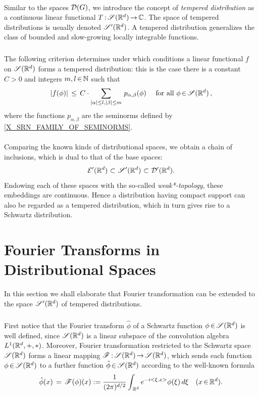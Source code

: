 \documentclass[11pt,twoside]{article}
\begin{document}
\paragraph{} %
Similar to the spaces ${\mathcal{D}}(G)$,
we introduce the concept of \textit{tempered distribution}
as a continuous linear functional $T {\,:\,}\mathscr{S}({\mathbb{R}}^d) {\,\to\,} {\mathbb{C}}$.
The space of tempered distributions is usually denoted $\mathscr{S}'({\mathbb{R}}^d)$.
A tempered distribution generalizes the class of bounded and slow-growing
locally integrable functions.

\subparagraph{}
The following criterion determines
under which conditions a linear functional $f$ on $\mathscr{S}({\mathbb{R}}^d)$
forms a tempered distribution:
this is the case 
\iff
there is a constant $C > 0$ and integers $m,l {\,\in\,} {\mathbb{N}}$ such that
\[
\abs{ f(\phi) } \, \leq \,
C \cdot \sum_{\abs{\alpha} \leq l, \abs{\beta} \leq m} \, p_{\alpha,\beta}(\phi)
\qfa \phi \xeof \SRd\,,
\]
where the functions $p_{\alpha,\beta}$ are the seminorms
defined by \eqref{X_SRN_FAMILY_OF_SEMINORMS}.

\paragraph{} %
Comparing the known kinds of distributional spaces,
we obtain a chain of inclusions,
which is dual to that of the base spaces:
\[
{\mathcal{E}}'({\mathbb{R}}^d) \, {\,\subset\,} \, \mathscr{S}'({\mathbb{R}}^d) \, {\,\subset\,} \, {\mathcal{D}}'({\mathbb{R}}^d).
\]
Endowing each of these spaces with the so-called \textit{weak*-topology},
these embeddings are continuous.
Hence a distribution having compact support can also be regarded
as a tempered distribution,
which in turn gives rise to a Schwartz distribution.

\section{Fourier Transforms in Distributional Spaces}                          %
In this section we shall elaborate that Fourier transformation can be
extended to the space $\mathscr{S}'({\mathbb{R}}^d)$ of tempered distributions.

\subparagraph{}
First notice 
that the Fourier transform $\hat{\phi}$
of a Schwartz function $\phi {\,\in\,} \mathscr{S}({\mathbb{R}}^d)$ is well defined,
since $\mathscr{S}({\mathbb{R}}^d)$ is a linear subspace of the convolution algebra $L^1({\mathbb{R}}^d,+,\ast)$.
Moreover, 
Fourier transformation restricted to the Schwartz space $\mathscr{S}({\mathbb{R}}^d)$
forms a linear mapping $\mathscr{F} {\,:\,}\mathscr{S}({\mathbb{R}}^d) {\,\to\,} \mathscr{S}({\mathbb{R}}^d)$,
which sends each function $\phi {\,\in\,} \mathscr{S}({\mathbb{R}}^d)$ to a further function
$\hat{\phi} {\,\in\,} \mathscr{S}({\mathbb{R}}^d)$ according to the well-known formula
\begin{equation}\label{FOURIER_TRANSFORM_OF_SCHWARTZ_FUNCTION}
\hat{\phi}(x) \,=\, \mathscr{F}(\phi)(x) :=
\frac{1}{(2\pi)^{d/2}}
\int_{\,{\mathbb{R}}^d} e^{-i <\xi,x>} \phi(\xi) \, d \xi
\quad (x {\,\in\,} {\mathbb{R}}^d).
\end{equation}
\end{document}
